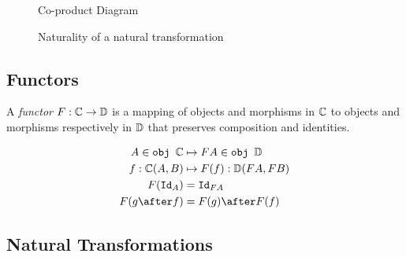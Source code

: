 \documentclass{Report}
\begin{document}
\begin{minipage}{0.47\linewidth}
    \begin{figure}[H]
        \centering
        \begin{framed}
        \end{framed}
        \caption{Co-product Diagram}
        \label{CoproductDiagram}
    \end{figure}
\end{minipage}\quad
\begin{minipage}{0.47\linewidth}
    \begin{figure}[H]
        \centering
        \begin{framed}
        \end{framed}
        \caption{Naturality of a natural transformation}
        \label{Naturality}
    \end{figure}
\end{minipage}\quad

\subsection{Functors}
A \textit{functor} $F: \mathbb{C} \rightarrow \mathbb{D}$ is a mapping of objects and morphisms in $\mathbb{C}$ to objects and morphisms respectively in $\mathbb{D}$ that preserves composition and identities.

\begin{align*}
    A\in\obj\C &\mapsto FA \in \obj\DC\\
    f: \C(A, B) &\mapsto F(f): \DC(FA, FB)\\
    F(\Id{A}) & = \Id{FA} \\
    F(g\after f) & = F(g)\after F(f)
\end{align*}

\subsection{Natural Transformations}
\end{document}
